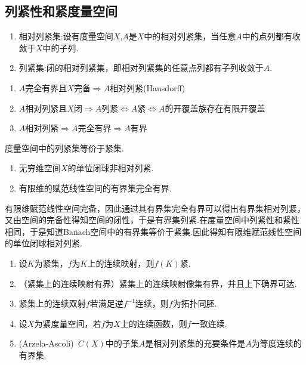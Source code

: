 \documentclass[lang=cn,10pt]{elegantbook}
\begin{document}
	\subsection{列紧性和紧度量空间}
	\begin{definition}[（相对）列紧集]
		\begin{enumerate}
			\item 相对列紧集:设有度量空间\(X\),\(A\)是\(X\)中的相对列紧集，当任意\(A\)中的点列都有收敛于\(X\)中的子列.
			\item 列紧集:闭的相对列紧集，即相对列紧集的任意点列都有子列收敛于\(A\).
		\end{enumerate}
	\end{definition}
	\begin{property}[(T1.6.2,T1.6.3,E1.6.3)]
		\begin{enumerate}
			\item \(A\)完全有界且\(X\)完备\(\Rightarrow{}A\)相对列紧(Hausdorff)
			\item \(A\)相对列紧且\(X\)闭\(\Rightarrow{}A\)列紧\(\Leftrightarrow A\)紧\(\Leftrightarrow A\)的开覆盖族存在有限开覆盖
			\item \(A\)相对列紧\(\Rightarrow{}A\)完全有界\(\Rightarrow{}A\)有界
		\end{enumerate}
	\end{property}
	\begin{note}
		度量空间中的列紧集等价于紧集.
	\end{note}
	\begin{theorem}[有限维和无穷维空间的本质区别(T1.6.1)]
		\begin{enumerate}
			\item 无穷维空间\(X\)的单位闭球非相对列紧.
			\item 有限维的赋范线性空间的有界集完全有界.
		\end{enumerate}
	\end{theorem}
	\begin{note}
		有限维赋范线性空间完备，因此通过其有界集完全有界可以得出有界集相对列紧，又由空间的完备性得知空间的闭性，于是有界集列紧.在度量空间中列紧性和紧性相同，于是知道Banach空间中的有界集等价于紧集.因此得知有限维赋范线性空间的单位闭球相对列紧.
	\end{note}
	\begin{theorem}[紧集上的连续映射性质(T1.6.8,C1.6.3,C1.6.4,,T1.6.9)]
		\begin{enumerate}
			\item 设\(K\)为紧集，\(f\)为\(K\)上的连续映射，则\(f(K)\)紧.
			\item （紧集上的连续映射有界）紧集上的连续映射像集有界，并且上下确界可达.
			\item 紧集上的连续双射\(f\)若满足逆\(f^{-1}\)连续，则\(f\)为拓扑同胚.
			\item 设\(X\)为紧度量空间，若\(f\)为\(X\)上的连续函数，则\(f\)一致连续.
			\item (Arzela-Ascoli)\ \(C(X)\)中的子集\(A\)是相对列紧集的充要条件是\(A\)为等度连续的有界集.
		\end{enumerate}
	\end{theorem}
	
\end{document}
